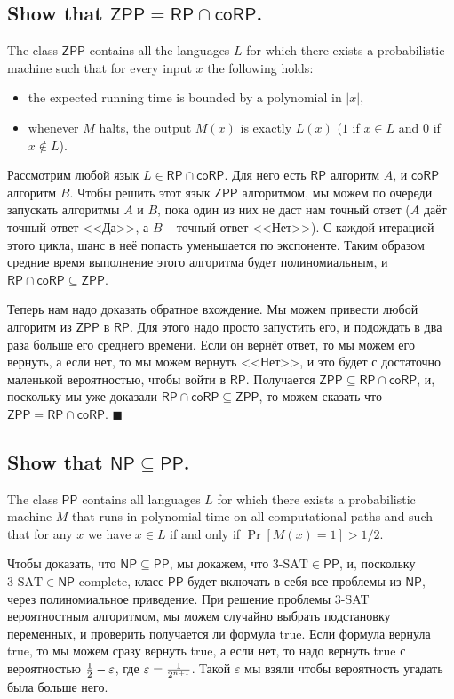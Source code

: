 \documentclass{article}
\let\temp\epsilon
\let\epsilon\varepsilon
\let\varepsilon\temp
\newcommand{\RP}{\ensuremath{\mathsf{RP}}}
\newcommand{\PP}{\ensuremath{\mathsf{PP}}}
\newcommand{\ZPP}{\ensuremath{\mathsf{ZPP}}}
\newcommand{\coRP}{\ensuremath{\mathsf{coRP}}}
\newcommand{\NP}{\ensuremath{\mathsf{NP}}}
\begin{document}
  \subsection{Show that $\ZPP = \RP \cap \coRP$.}
  \begin{centerframebox}
    The class \ZPP{} contains all the languages $L$ for which there exists a probabilistic machine such that for every input $x$ the following holds:
    \begin{itemize}
      \item the expected running time is bounded by a polynomial in $|x|$,
      \item whenever $M$ halts, the output $M(x)$ is exactly $L(x)$ ($1$ if $x \in L$ and $0$ if $x \not\in L$).
    \end{itemize}
  \end{centerframebox}
  Рассмотрим любой язык $L \in \RP \cap \coRP$.
  Для него есть \RP{} алгоритм $A$, и \coRP{} алгоритм $B$.
  Чтобы решить этот язык \ZPP{} алгоритмом, мы можем по очереди запускать алгоритмы $A$ и $B$, пока один из них не даст нам точный ответ ($A$ даёт точный ответ <<Да>>, а $B$ -- точный ответ <<Нет>>).
  С каждой итерацией этого цикла, шанс в неё попасть уменьшается по экспоненте.
  Таким образом средние время выполнение этого алгоритма будет полиномиальным, и $\RP \cap \coRP \subseteq \ZPP$.

  Теперь нам надо доказать обратное вхождение.
  Мы можем привести любой алгоритм из \ZPP{} в \RP.
  Для этого надо просто запустить его, и подождать в два раза больше его среднего времени.
  Если он вернёт ответ, то мы можем его вернуть, а если нет, то мы можем вернуть <<Нет>>, и это будет с достаточно маленькой вероятностью, чтобы войти в \RP.
  Получается $\ZPP \subseteq  \RP \cap \coRP$, и, поскольку мы уже доказали $\RP \cap \coRP \subseteq \ZPP$, то можем сказать что $\ZPP = \RP \cap \coRP$.
  $\blacksquare$

  \subsection{Show that $\NP \subseteq \PP$.}
  \begin{centerframebox}
    The class \PP{} contains all languages $L$ for which there exists a probabilistic machine $M$ that runs in polynomial time on all computational paths and such that for any $x$ we have $x \in L$ if and only if $\Pr[M(x) = 1] > 1/2$.
  \end{centerframebox}
  Чтобы доказать, что $\NP \subseteq \PP$, мы докажем, что $3\textrm{-SAT} \in \PP$, и, поскольку $3\textrm{-SAT} \in \NP\textrm{-complete}$, класс \PP{} будет включать в себя все проблемы из \NP, через полиномиальное приведение.
  При решение проблемы 3-SAT вероятностным алгоритмом, мы можем случайно выбрать подстановку переменных, и проверить получается ли формула true.
  Если формула вернула true, то мы можем сразу вернуть true, а если нет, то надо вернуть true с вероятностью $\f{1}{2} - \epsilon$, где $\epsilon = \f{1}{2^{n+1}}$.
  Такой $\epsilon$ мы взяли чтобы вероятность угадать была больше него.
\end{document}
